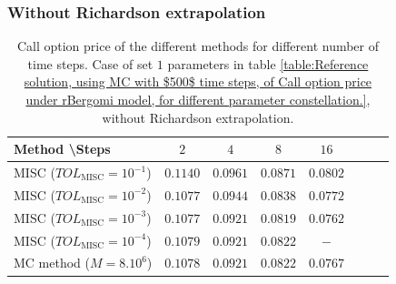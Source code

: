 \subsubsection*{Without Richardson extrapolation}
\begin{table}[h!]
	\centering
	\begin{tabular}{l*{6}{c}r}
		Method \textbackslash  Steps            & $2$ & $4$ & $8$ & $16$ &   \\
		\hline
		MISC ($TOL_{\text{MISC}}=10^{-1}$)  & $0.1140$ & $0.0961$ & $0.0871$ & $0.0802$  \\
		MISC ($TOL_{\text{MISC}}=10^{-2}$)  & $0.1077$ & $0.0944$ & $0.0838$ & $0.0772$  \\

		MISC ($TOL_{\text{MISC}}=10^{-3}$)  & $0.1077$ & $0.0921$ & $0.0819$ & $0.0762$  \\
		MISC ($TOL_{\text{MISC}}=10^{-4}$)  & $0.1079$ & $0.0921$ & $0.0822$ & $-$  \\
		\hline
		MC method ($M=8.10^{6}$)   & $  0.1078$ & $ 0.0921
		$  & $   0.0822
		$ & $ 0.0767$ \\		
		
		\hline
	\end{tabular}
	\caption{ Call option price of the different methods for different number of time steps. Case of set $1$ parameters in table \ref{table:Reference solution, using MC with $500$ time steps, of Call option price under rBergomi model, for different parameter constellation.}, without Richardson extrapolation.}
	\label{table: Call option price of the different methods for different number of time steps. Case set 1}
\end{table}


